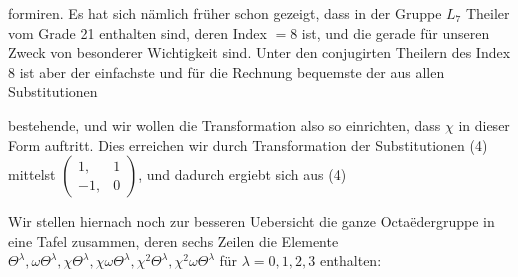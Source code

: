 
formiren. Es hat sich nämlich früher schon gezeigt, dass in der Gruppe $L_7$ Theiler vom Grade 21 enthalten sind, deren Index $= 8$ ist, und die gerade für unseren Zweck von besonderer Wichtigkeit sind. Unter den conjugirten Theilern des Index 8 ist aber der einfachste und für die Rechnung bequemste der aus allen Substitutionen


bestehende, und wir wollen die Transformation also so einrichten, dass $\chi$ in dieser Form auftritt. Dies erreichen wir durch Transformation der Substitutionen (4) mittelst $\begin{pmatrix} 1, & 1 \\ -1, & 0 \end{pmatrix}$, und dadurch ergiebt sich aus (4)


Wir stellen hiernach noch zur besseren Uebersicht die ganze Octa\"edergruppe in eine Tafel zusammen, deren sechs Zeilen die Elemente $\Theta^\lambda, \omega\Theta^\lambda, \chi\Theta^\lambda, \chi\omega\Theta^\lambda, \chi^2\Theta^\lambda, \chi^2\omega\Theta^\lambda$ für $\lambda = 0, 1, 2, 3$ enthalten:

